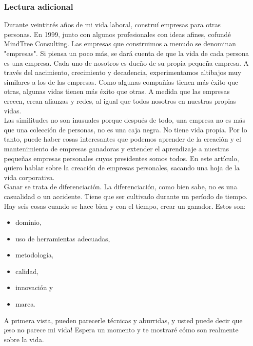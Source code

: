 \documentclass[10pt]{book}
\begin{document}
\subsubsection{Lectura adicional}
Durante veintitrés años de mi vida laboral, construí empresas para otras personas. En 1999, junto con algunos profesionales con ideas afines, cofundé MindTree Consulting. Las empresas que construimos a menudo se denominan "empresas". Si piensa un poco más, se dará cuenta de que la vida de cada persona es una empresa. Cada uno de nosotros es dueño de su propia pequeña empresa. A través del nacimiento, crecimiento y decadencia, experimentamos altibajos muy similares a los de las empresas. Como algunas compañías tienen más éxito que otras, algunas vidas tienen más éxito que otras. A medida que las empresas crecen, crean alianzas y redes, al igual que todos nosotros en nuestras propias vidas.\\
Las similitudes no son inusuales porque después de todo, una empresa no es más que una colección de personas, no es una caja negra. No tiene vida propia. Por lo tanto, puede haber cosas interesantes que podemos aprender de la creación y el mantenimiento de empresas ganadoras y extender el aprendizaje a nuestras pequeñas empresas personales cuyos presidentes somos todos. En este artículo, quiero hablar sobre la creación de empresas personales, sacando una hoja de la vida corporativa.\\
Ganar se trata de diferenciación. La diferenciación, como bien sabe, no es una casualidad o un accidente. Tiene que ser cultivado durante un período de tiempo. Hay seis cosas cuando se hace bien y con el tiempo, crear un ganador. Estos son:
\begin{itemize}
\item dominio, 
\item uso de herramientas adecuadas, 
\item metodología, 
\item calidad, 
\item innovación y 
\item marca.
\end{itemize}
A primera vista, pueden parecerle técnicas y aburridas, y usted puede decir que ¡eso no parece mi vida! Espera un momento y te mostraré cómo son realmente sobre la vida.\\
\end{document}
